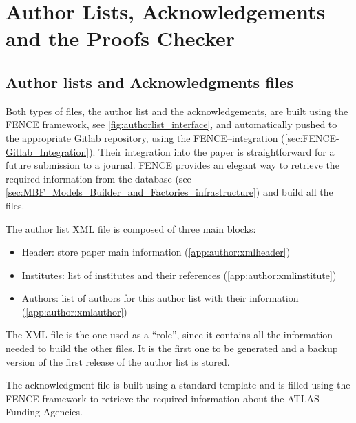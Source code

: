 
\section{Author Lists, Acknowledgements and the Proofs Checker}%
\label{sec:Authorlists_Acknowledgements_and_ProofChecker}

\subsection{Author lists and Acknowledgments files}%
\label{sec:Author_lists_and_acknowledgments_files}

Both types of files, the author list and the acknowledgements, are built using the FENCE framework, see \cref{fig:authorlist_interface},
and automatically pushed to the appropriate Gitlab repository, using the FENCE--\gitlab integration (\cref{sec:FENCE-Gitlab_Integration}).
Their integration into the paper is straightforward for a future submission to a journal.
FENCE provides an elegant way to retrieve the required information from the database (see \cref{sec:MBF_Models_Builder_and_Factories_infrastructure}) and build all the files.
 
The author list XML file is composed of three main blocks:
\begin{itemize}
\item Header: store paper main information (\cref{app:author:xmlheader})
\item Institutes: list of institutes and their references (\cref{app:author:xmlinstitute})
\item Authors: list of authors for this author list with their information (\cref{app:author:xmlauthor})
\end{itemize}
 
The XML file is the one used as a \enquote{role}, since it contains all the information needed to build the other files.
It is the first one to be generated and a backup version of the first release of the author list is stored.
 
The acknowledgment  file is built using a standard template and is filled using the FENCE framework to retrieve the required information about the ATLAS Funding Agencies.

